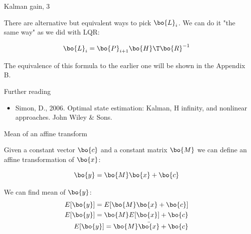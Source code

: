 \documentclass{beamer}
\begin{document}
\begin{frame}{Kalman gain, 3}
	\begin{flushleft}
		
		There are alternative but equivalent ways to pick $\bo{L}_i$. We can do it "the same way" as we did with LQR:
		
		\begin{equation}
			\bo{L}_i = \bo{P}_{i+1} \bo{H}\T \bo{R}^{-1}
		\end{equation}
		
		The equivalence of this formula to the earlier one will be shown in the Appendix B.
		
		
	\end{flushleft}
\end{frame}

\begin{frame}{Further reading}
	\begin{flushleft}
		
		\begin{itemize}
			\item Simon, D., 2006. Optimal state estimation: Kalman, H infinity, and nonlinear approaches. John Wiley \& Sons.
		\end{itemize}
		
	\end{flushleft}
\end{frame}


\myqrframe



\begin{frame}
	\begin{flushleft}
		
		
	\end{flushleft}
\end{frame}

\begin{frame}{Mean of an affine transform}
	\begin{flushleft}
		
		Given a constant vector $\bo{c}$ and a constant matrix $\bo{M}$ we can define an affine transformation of $\bo{x}$:
		
		\begin{equation}
			\bo{y} = \bo{M}\bo{x} + \bo{c}
		\end{equation}
		
		We can find mean of $\bo{y}$:
		\begin{align}
			E[\bo{y}] = E[\bo{M}\bo{x} + \bo{c}] \\
			E[\bo{y}] = \bo{M}E[\bo{x}] + \bo{c} \\
			E[\bo{y}] = \bo{M}\bar{\bo{x}} + \bo{c}
		\end{align}
		
		
	\end{flushleft}
\end{frame}
\end{document}
